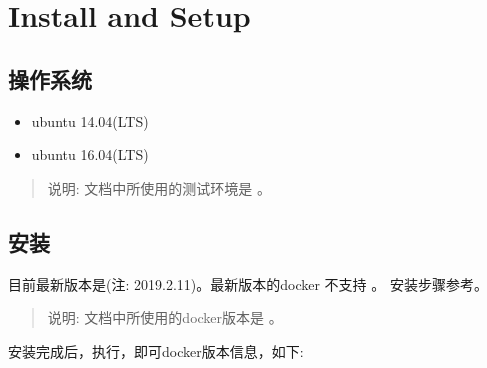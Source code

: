 \documentclass[letterpaper,10pt,english]{sphinxmanual}
\begin{document}
\section{Install and Setup}
\label{\detokenize{docker/intro:install-and-setup}}

\subsection{操作系统}
\label{\detokenize{docker/intro:id8}}\begin{itemize}
\item {} 
ubuntu 14.04(LTS)

\item {} 
ubuntu 16.04(LTS)

\end{itemize}
\begin{quote}

说明: 文档中所使用的测试环境是 。
\end{quote}


\subsection{安装}
\label{\detokenize{docker/intro:id9}}
目前最新版本是(注: 2019.2.11)。最新版本的docker 不支持 。
安装步骤参考。
\begin{quote}

说明: 文档中所使用的docker版本是 。
\end{quote}

安装完成后，执行，即可docker版本信息，如下:
\end{document}
